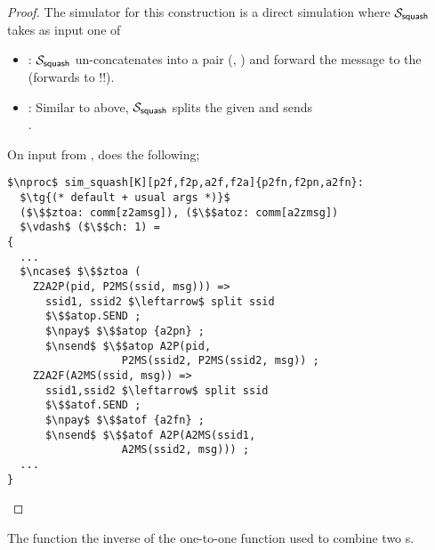\begin{proof}
The simulator for this construction is a direct simulation where $\mathcal{S}_{\mathsf{squash}}$ takes as input one of 
\begin{itemize}
	\item {}: $\mathcal{S}_{\mathsf{squash}}$ un-concatenates  into a pair (, ) and forward the message  to the \idealP (forwards to !!\F).
	\item {}: Similar to above, $\mathcal{S}_{\mathsf{squash}}$ splits the given  and sends \\ . 
\end{itemize}

On input from \Z,  does the following; 
\begin{lstlisting}[basicstyle=\footnotesize\BeraMonottFamily, frame=single, mathescape]
$\nproc$ sim_squash[K][p2f,f2p,a2f,f2a]{p2fn,f2pn,a2fn}:
  $\tg{(* default + usual args *)}$
  ($\$$ztoa: comm[z2amsg]), ($\$$atoz: comm[a2zmsg]) 
  $\vdash$ ($\$$ch: 1) =
{
  ...
  $\ncase$ $\$$ztoa (
    Z2A2P(pid, P2MS(ssid, msg))) =>
      ssid1, ssid2 $\leftarrow$ split ssid
      $\$$atop.SEND ;
      $\npay$ $\$$atop {a2pn} ;
      $\nsend$ $\$$atop A2P(pid, 
                  P2MS(ssid2, P2MS(ssid2, msg)) ;
    Z2A2F(A2MS(ssid, msg)) =>
      ssid1,ssid2 $\leftarrow$ split ssid
      $\$$atof.SEND ; 
      $\npay$ $\$$atof {a2fn} ;
      $\nsend$ $\$$atof A2P(A2MS(ssid1, 
                  A2MS(ssid2, msg))) ;
  ...
}	  
\end{lstlisting}
\end{proof}
The  function the inverse of the one-to-one function used to combine two s.

